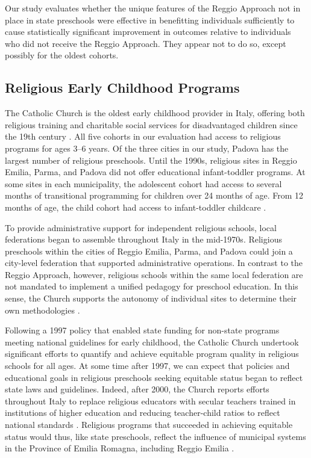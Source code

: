 Our study evaluates whether the unique features of the Reggio Approach not in place in state preschools were effective in benefitting individuals sufficiently to cause statistically significant improvement in outcomes relative to individuals who did not receive the Reggio Approach. They appear not to do so, except possibly for the oldest cohorts.

\subsection{Religious Early Childhood Programs}

The Catholic Church is the oldest early childhood provider in Italy, offering both religious training and charitable social services for disadvantaged children since the 19th century \citep{OECD_2001_Italy-Country-Note}. All five cohorts in our evaluation had access to religious programs for ages 3--6 years. Of the three cities in our study, Padova has the largest number of religious preschools. Until the 1990s, religious sites in Reggio Emilia, Parma, and Padova did not offer educational infant-toddler programs. At some sites in each municipality, the adolescent cohort had access to several months of transitional programming for children over 24 months of age. From 12 months of age, the child cohort had access to infant-toddler childcare \citep{Malizia-Cicatelli_2011_BOOK_Catholic-School,CEHD_2016_Historical-Analysis}.

To provide administrative support for independent religious schools, local federations began to assemble throughout Italy in the mid-1970s. Religious preschools within the cities of Reggio Emilia, Parma, and Padova could join a city-level federation that supported administrative operations. In contrast to the Reggio Approach, however, religious schools within the same local federation are not mandated to implement a unified pedagogy for preschool education. In this sense, the Church supports the autonomy of individual sites to determine their own methodologies \citep{Malizia-Cicatelli_2011_BOOK_Catholic-School}.

Following a 1997 policy that enabled state funding for non-state programs meeting national guidelines for early childhood, the Catholic Church undertook significant efforts to quantify and achieve equitable program quality in religious schools for all ages. At some time after 1997, we can expect that policies and educational goals in religious preschools seeking equitable status began to reflect state laws and guidelines. Indeed, after 2000, the Church reports efforts throughout Italy to replace religious educators with secular teachers trained in institutions of higher education and reducing teacher-child ratios to reflect national standards \citep{Malizia-Cicatelli_2011_BOOK_Catholic-School}. Religious programs that succeeded in achieving equitable status would thus, like state preschools, reflect the influence of municipal systems in the Province of Emilia Romagna, including Reggio Emilia \citep{Hohnerlein_2009_Paradox-Public-Preschools,OECD_2001_Italy-Country-Note}.

